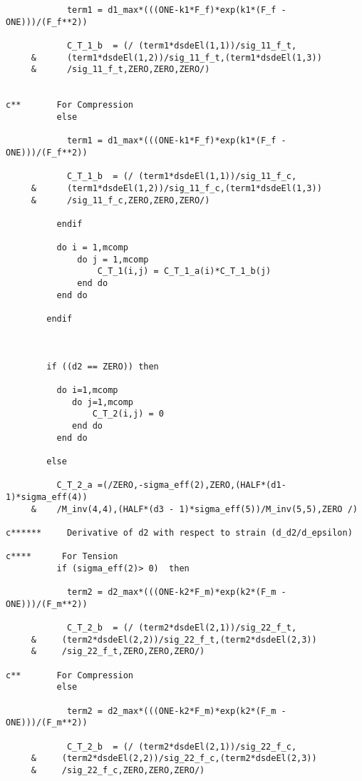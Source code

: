 \begin{lstlisting}
            term1 = d1_max*(((ONE-k1*F_f)*exp(k1*(F_f - ONE)))/(F_f**2))
          
            C_T_1_b  = (/ (term1*dsdeEl(1,1))/sig_11_f_t,
     &      (term1*dsdeEl(1,2))/sig_11_f_t,(term1*dsdeEl(1,3))
     &      /sig_11_f_t,ZERO,ZERO,ZERO/)

            
c**       For Compression           
          else
              
            term1 = d1_max*(((ONE-k1*F_f)*exp(k1*(F_f - ONE)))/(F_f**2))
          
            C_T_1_b  = (/ (term1*dsdeEl(1,1))/sig_11_f_c,
     &      (term1*dsdeEl(1,2))/sig_11_f_c,(term1*dsdeEl(1,3))
     &      /sig_11_f_c,ZERO,ZERO,ZERO/)
            
          endif
      
          do i = 1,mcomp
              do j = 1,mcomp
                  C_T_1(i,j) = C_T_1_a(i)*C_T_1_b(j)
              end do
          end do
       
        endif
            
        

        if ((d2 == ZERO)) then
          
          do i=1,mcomp
             do j=1,mcomp
                 C_T_2(i,j) = 0        
             end do
          end do 
      
        else 
            
          C_T_2_a =(/ZERO,-sigma_eff(2),ZERO,(HALF*(d1- 1)*sigma_eff(4))
     &    /M_inv(4,4),(HALF*(d3 - 1)*sigma_eff(5))/M_inv(5,5),ZERO /) 
          
c******     Derivative of d2 with respect to strain (d_d2/d_epsilon)
      
c****      For Tension           
          if (sigma_eff(2)> 0)  then
              
            term2 = d2_max*(((ONE-k2*F_m)*exp(k2*(F_m - ONE)))/(F_m**2))
          
            C_T_2_b  = (/ (term2*dsdeEl(2,1))/sig_22_f_t, 
     &     (term2*dsdeEl(2,2))/sig_22_f_t,(term2*dsdeEl(2,3))
     &     /sig_22_f_t,ZERO,ZERO,ZERO/) 
     
c**       For Compression                       
          else                                         
              
            term2 = d2_max*(((ONE-k2*F_m)*exp(k2*(F_m - ONE)))/(F_m**2))
          
            C_T_2_b  = (/ (term2*dsdeEl(2,1))/sig_22_f_c, 
     &     (term2*dsdeEl(2,2))/sig_22_f_c,(term2*dsdeEl(2,3))
     &     /sig_22_f_c,ZERO,ZERO,ZERO/) 
            

\end{lstlisting}
